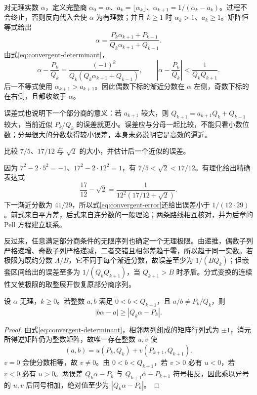 \documentclass[UTF8,12pt,a4paper,fontset=fandol]{ctexbook}
\begin{document}
对无理实数 $\alpha$，定义完整商 $\alpha_0=\alpha$、$a_k=\lfloor\alpha_k\rfloor$、$\alpha_{k+1}=1/(\alpha_k-a_k)$。过程不会终止，否则反向代入会使 $\alpha$ 为有理数；并且 $k\ge1$ 时 $\alpha_k>1$、$a_k\ge1$。矩阵恒等式给出
\begin{equation}
 \alpha=\frac{P_k\alpha_{k+1}+P_{k-1}}
 {Q_k\alpha_{k+1}+Q_{k-1}}.
 \label{eq:complete-quotient}
\end{equation}
由式\eqref{eq:convergent-determinant}，
\begin{equation}
 \alpha-\frac{P_k}{Q_k}
 =\frac{(-1)^k}{Q_k(Q_k\alpha_{k+1}+Q_{k-1})},\qquad
 \left|\alpha-\frac{P_k}{Q_k}\right|<\frac1{Q_kQ_{k+1}}.
 \label{eq:convergent-error}
\end{equation}
后一不等式使用 $\alpha_{k+1}>a_{k+1}$。因此偶数下标的渐近分数在 $\alpha$ 左侧，奇数下标的在右侧，且都收敛于 $\alpha$。

误差式也说明下一个部分商的意义：若 $a_{k+1}$ 较大，则 $Q_{k+1}=a_{k+1}Q_k+Q_{k-1}$ 较大，当前近似 $P_k/Q_k$ 的误差就更小。误差应与分母一起比较，不能只看小数位数；分母很大的分数获得较小误差，本身未必说明它是高效的逼近。

\begin{example}[不依赖小数展开的误差计算]
比较 $7/5$、$17/12$ 与 $\sqrt2$ 的大小，并估计后一个近似的误差。
\end{example}
\begin{solve}
因为 $7^2-2\cdot5^2=-1$、$17^2-2\cdot12^2=1$，有 $7/5<\sqrt2<17/12$。有理化给出精确表达式
\[
 \frac{17}{12}-\sqrt2
 =\frac{1}{12^2(17/12+\sqrt2)}.
\]
下一渐近分数为 $41/29$，所以式\eqref{eq:convergent-error}还给出误差小于 $1/(12\cdot29)$。前式来自平方差，后式来自连分数的一般理论；两条路线相互核对，并为后章的 Pell 方程建立联系。
\end{solve}

反过来，任意满足部分商条件的无限序列也确定一个无理极限。由递推，偶数子列严格递增、奇数子列严格递减，二者交错且相邻差趋于零，所以趋于同一实数。若极限为既约分数 $A/B$，它不同于每个渐近分数，故误差至少为 $1/(BQ_k)$；但嵌套区间给出的误差至多为 $1/(Q_kQ_{k+1})$，当 $Q_{k+1}>B$ 时矛盾。分式变换的连续性又使极限的取整展开恢复原部分商序列。

\begin{lemma}[第二类逼近性质]
\label{lem:best-approximation}
设 $\alpha$ 无理，$k\ge0$。若整数 $a,b$ 满足 $0<b<Q_{k+1}$，且 $a/b\ne P_k/Q_k$，则
\[
 |b\alpha-a|\ge|Q_k\alpha-P_k|.
\]
\end{lemma}
\begin{proof}
由式\eqref{eq:convergent-determinant}，相邻两列组成的矩阵行列式为 $\pm1$，消元所得逆矩阵仍为整数矩阵，故唯一存在整数 $u,v$ 使
\[
 (a,b)=u(P_k,Q_k)+v(P_{k+1},Q_{k+1}).
\]
$v=0$ 会使分数相等，故 $v\ne0$。由 $0<b<Q_{k+1}$，若 $v>0$ 必有 $u<0$，若 $v<0$ 必有 $u>0$。两误差 $Q_k\alpha-P_k$ 与 $Q_{k+1}\alpha-P_{k+1}$ 符号相反，因此乘以异号的 $u,v$ 后同号相加，绝对值至少为 $|Q_k\alpha-P_k|$。
\end{proof}
\end{document}
